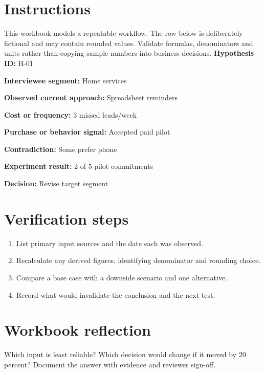 \documentclass[11pt]{article}
\begin{document}
\SuiteOpen
\section{Instructions}
This workbook models a repeatable workflow. The row below is deliberately fictional and may contain rounded values. Validate formulas, denominators and units rather than copying sample numbers into business decisions.
\noindent\textbf{Hypothesis ID:} H-01\par\medskip
\noindent\textbf{Interviewee segment:} Home services\par\medskip
\noindent\textbf{Observed current approach:} Spreadsheet reminders\par\medskip
\noindent\textbf{Cost or frequency:} 3 missed leads/week\par\medskip
\noindent\textbf{Purchase or behavior signal:} Accepted paid pilot\par\medskip
\noindent\textbf{Contradiction:} Some prefer phone\par\medskip
\noindent\textbf{Experiment result:} 2 of 5 pilot commitments\par\medskip
\noindent\textbf{Decision:} Revise target segment\par\medskip
\section{Verification steps}
\begin{enumerate}[leftmargin=*,itemsep=5pt]
\item List primary input sources and the date each was observed.
\item Recalculate any derived figures, identifying denominator and rounding choice.
\item Compare a base case with a downside scenario and one alternative.
\item Record what would invalidate the conclusion and the next test.
\end{enumerate}

\section{Workbook reflection}
Which input is least reliable? Which decision would change if it moved by 20 percent? Document the answer with evidence and reviewer sign-off.
\end{document}
